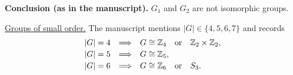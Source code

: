 \medskip
\noindent\textbf{Conclusion (as in the manuscript).}
$G_1$ and $G_2$ are not isomorphic groups.

\medskip
\noindent\underline{Groups of small order.}
The manuscript mentions $|G|\in\{4,5,6,7\}$ and records
\[
\begin{array}{r@{\quad\Longrightarrow\quad}l}
 |G|=4 & G\cong\mathbb Z_4\quad\text{or}\quad
               \mathbb Z_2\times\mathbb Z_2,\\[2pt]
 |G|=5 & G\cong\mathbb Z_5,\\[2pt]
 |G|=6 & G\cong\mathbb Z_6\quad\text{or}\quad S_3.
\end{array}
\]
